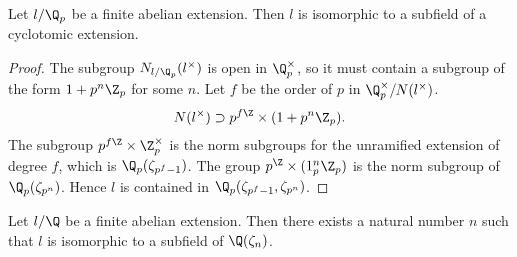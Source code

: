 \begin{theorem} \label{thm:local Kronecker Weber}
	Let $l/\Q_p$ be a finite abelian extension.
	Then $l$ is isomorphic to a subfield of a cyclotomic extension.
\end{theorem}

\begin{proof}
	The subgroup $N_{l/\Q_p}(l^\times)$ is open in $\Q_p^\times$, so it must contain
	a subgroup of the form $1+p^n\Z_p$ for some $n$.
	Let $f$ be the order of $p$ in $\Q_p^\times / N(l^\times)$.
	\[
		N(l^\times) \supset p^{f\Z} \times (1 + p^n\Z_p).
	\]
	The subgroup $p^{f\Z} \times \Z_p^\times$ is the norm subgroups for the unramified extension
	of degree $f$, which is $\Q_p(\zeta_{p^f-1})$.
	The group $p^\Z \times (1_p^n \Z_p)$ is the norm subgroup of $\Q_p(\zeta_{p^n})$.
	Hence $l$ is contained in $\Q_p(\zeta_{p^f-1}, \zeta_{p^n})$.
\end{proof}

\begin{theorem} \label{thm:Kronecker Weber}
	Let $l/\Q$ be a finite abelian extension.
	Then there exists a natural number $n$ such that $l$ is isomorphic to
	a subfield of $\Q(\zeta_n)$.
\end{theorem}

